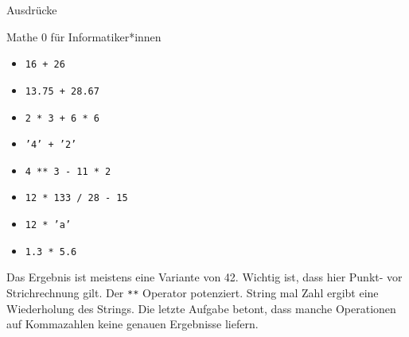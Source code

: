 \begin{task}[points=auto]{Ausdrücke }
\begin{subtask*}[points=0]{Mathe 0 für Informatiker*innen}
        \begin{multicols}{3}
            \begin{itemize}
                \item \texttt{16 + 26}
                \item \texttt{13.75 + 28.67}
                \item \texttt{2 * 3 + 6 * 6}
                \item \texttt{'4' + '2'}
                \item \texttt{4 ** 3 - 11 * 2}
                \item \texttt{12 * 133 / 28 - 15}
                \item \texttt{12 * 'a'}
                \item \texttt{1.3 * 5.6}
            \end{itemize}
        \end{multicols}


        \begin{solution}
            Das Ergebnis ist meistens eine Variante von 42. Wichtig ist, dass hier
            Punkt- vor Strichrechnung gilt. Der \texttt{**} Operator potenziert.
            String mal Zahl ergibt eine Wiederholung des Strings. Die letzte Aufgabe
            betont, dass manche Operationen auf Kommazahlen keine genauen Ergebnisse
            liefern.
        \end{solution}
    \end{subtask*}
\end{task}
